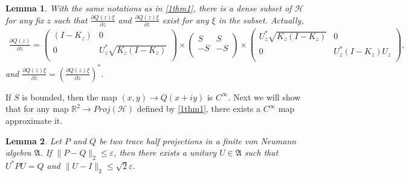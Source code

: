 \documentclass[a4paper,10pt]{amsart}
\newtheorem{lemma}{Lemma}[section]
\newcommand{\AAA}{\mathfrak A}
\newcommand{\HHH}{\mathcal H} %
\newcommand{\R}{\mathbb R}  %
\begin{document}
\begin{lemma}
    With the same notations as in \cref{1thm1}, 
    there is a dense subset of $\HHH$ for any fix $z$ such that
    $\frac{\partial Q(z)\xi}{\partial z}$ and 
    $\frac{\partial Q(z)\xi}{\partial \bar{z}}$
    exist for any $\xi$ in the
    subset. Actually, 
    \begin{align*}
        \frac{\partial Q(z)}{\partial z} =
            \begin{pmatrix}
                (I-K_z) & 0 \\
                0 & U^{*}_{z}\sqrt{K_{z}(I-K_{z})} \\
            \end{pmatrix}
            \times
            \begin{pmatrix}
                S & S \\
                -S & -S \\
            \end{pmatrix}
            \times     
            \begin{pmatrix}
                U^{*}_{z}\sqrt{K_{z}(I-K_{z})} & 0 \\
                0 & U^{*}_{z}(I- K_{z})U_z \\
            \end{pmatrix},
    \end{align*}
and $\frac{\partial Q(z)\xi}{\partial \bar{z}} 
= (\frac{\partial Q(z)\xi}{\partial z})^{*}$. 
\end{lemma}

If $S$ is bounded, then the map $(x,y) \rightarrow Q(x+iy)$  
is $C^{\infty}$. Next we will show that for any map $\R^2 \rightarrow
Proj(\HHH)$ defined by \cref{1thm1}, there exists a $C^{\infty}$ map
approximate it.

\begin{lemma} \label{h_lem1}
   Let $P$ and $Q$ be two trace half projections in a finite von Neumann 
   algebra $\AAA$. If $\|P - Q\|_2 \leq \varepsilon$, then there exists 
   a unitary $U \in \AAA$ such that $U^{*}PU = Q$ and 
   $\|U - I\|_2 \leq \sqrt{2}\varepsilon$.
\end{lemma}
\end{document}
